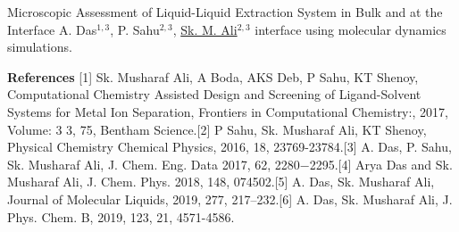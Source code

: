 \begin{abstract_online}{Microscopic Assessment of Liquid-Liquid Extraction System in Bulk and at the Interface}{%
        A. Das$^{1, 3}$, P. Sahu$^{2, 3}$, \underline{Sk. M. Ali}$^{2, 3}$}{%
        \IStag}
interface using molecular dynamics simulations. 
    
        \textbf{References} \newline{}[1] Sk. Musharaf Ali, A Boda, AKS Deb, P Sahu, KT Shenoy, Computational Chemistry Assisted Design and Screening of Ligand-Solvent Systems for Metal Ion Separation, Frontiers in Computational Chemistry:, 2017, Volume: 3 3, 75, Bentham Science.\newline{}[2] P Sahu, Sk. Musharaf Ali, KT Shenoy, Physical Chemistry Chemical Physics, 2016, 18, 23769-23784.\newline{}[3] A. Das, P. Sahu, Sk. Musharaf Ali, J. Chem. Eng. Data 2017, 62, 2280−2295.\newline{}[4] Arya Das and Sk. Musharaf Ali,    J. Chem. Phys. 2018, 148, 074502.\newline{}[5] A. Das, Sk. Musharaf Ali, Journal of Molecular Liquids, 2019, 277, 217–232.\newline{}[6] A. Das, Sk. Musharaf Ali, J. Phys. Chem. B, 2019, 123, 21, 4571-4586.
    \end{abstract_online}
    